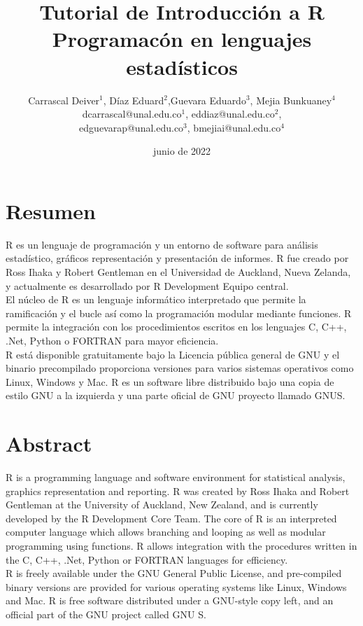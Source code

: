 \documentclass{article}
\title{Tutorial de Introducción a R \\
    \small Programacón en lenguajes estadísticos\\
    }
\author{Carrascal Deiver$^{1}$, Díaz Eduard$^{2}$,Guevara Eduardo$^{3}$, Mejia Bunkuaney$^{4}$\\
  \small dcarrascal@unal.edu.co$^{1}$, eddiaz@unal.edu.co$^{2}$,\\ \small edguevarap@unal.edu.co$^{3}$, bmejiai@unal.edu.co$^{4}$\\
  \date{junio de 2022}
  }
\begin{document}
\maketitle  
\section{Resumen}
R es un lenguaje de programación y un entorno de software para análisis estadístico, gráficos
representación y presentación de informes. R fue creado por Ross Ihaka y Robert Gentleman en el Universidad de Auckland, Nueva Zelanda, y actualmente es desarrollado por R Development
Equipo central.\\ El núcleo de R es un lenguaje informático interpretado que permite la ramificación y el bucle así como la programación modular mediante funciones. R permite la integración con los procedimientos escritos en los lenguajes C, C++, .Net, Python o FORTRAN para mayor eficiencia.\\
 R está disponible gratuitamente bajo la Licencia pública general de GNU y el binario precompilado proporciona versiones para varios sistemas operativos como Linux, Windows y Mac. R es un software libre distribuido bajo una copia de estilo GNU a la izquierda y una parte oficial de GNU proyecto llamado GNUS. 

\section{Abstract}
R is a programming language and software environment for statistical analysis, graphics
representation and reporting. R was created by Ross Ihaka and Robert Gentleman at the University of Auckland, New Zealand, and is currently developed by the R Development Core Team. The core of R is an interpreted computer language which allows branching and looping as well as modular programming using functions. R allows integration with the procedures written in the C, C++, .Net, Python or FORTRAN languages for efficiency.\\
R is freely available under the GNU General Public License, and pre-compiled binary versions are provided for various operating systems like Linux, Windows and Mac. R is free software distributed under a GNU-style copy left, and an official part of the GNU project called GNU S.

\newpage
\end{document}
